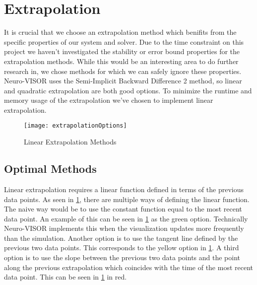 
\section{Extrapolation}%
\label{sec:extrapolation}

It is crucial that we choose an extrapolation method which benifits from the specific properties of our system and solver.
Due to the time constraint on this project we haven't investigated the stability or error bound properties for the extrapolation methods.
While this would be an interesting area to do further research in, we chose methods for which we can safely ignore these properties.
Neuro-VISOR uses the Semi-Implicit Backward Difference 2 method\cite{neuroVISOR}, so linear and quadratic extrapolation are both good options.
To minimize the runtime and memory usage of the extrapolation we've chosen to implement linear extrapolation.

\begin{figure}[H]
    \centering
    \texttt{[image: extrapolationOptions]}
    \caption{Linear Extrapolation Methods}%
    \label{fig:extrapMethods}
\end{figure}

\subsection{Optimal Methods}%
\label{sub:optimal_methods}

Linear extrapolation requires a linear function defined in terms of the previous data points.
As seen in \cref{fig:extrapMethods}, there are multiple ways of defining the linear function.
The naive way would be to use the constant function equal to the most recent data point.
An example of this can be seen in \cref{fig:extrapMethods} as the green option.
Technically Neuro-VISOR implements this when the visualization updates more frequently than the simulation.
Another option is to use the tangent line defined by the previous two data points.
This corresponds to the yellow option in \cref{fig:extrapMethods}.
A third option is to use the slope between the previous two data points and the point along the previous extrapolation which coincides with the time of the most recent data point.
This can be seen in \cref{fig:extrapMethods} in red.

